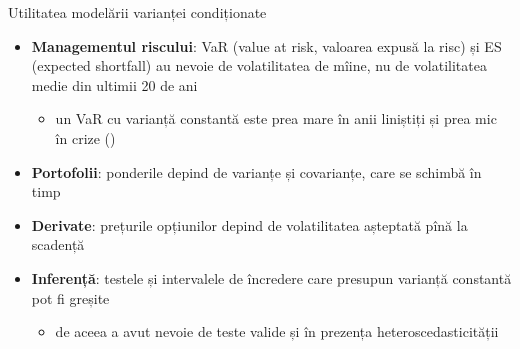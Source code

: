 \begin{frame}{Utilitatea modelării varianței condiționate}
\itemsize{\small}
\begin{itemize}
    \item \textbf{Managementul riscului}: VaR (value at risk, valoarea expusă la risc) și ES (expected shortfall) au nevoie de volatilitatea de mîine, nu de volatilitatea medie din ultimii 20 de ani
    \begin{itemize}
        \item un VaR cu varianță constantă este prea mare în anii liniștiți și prea mic în crize ()
    \end{itemize}
    \item \textbf{Portofolii}: ponderile depind de varianțe și covarianțe, care se schimbă în timp
    \item \textbf{Derivate}: prețurile opțiunilor depind de volatilitatea așteptată pînă la scadență
    \item \textbf{Inferență}: testele și intervalele de încredere care presupun varianță constantă pot fi greșite
    \begin{itemize}
        \item de aceea  a avut nevoie de teste valide și în prezența heteroscedasticității
    \end{itemize}
\end{itemize}
\end{frame}

